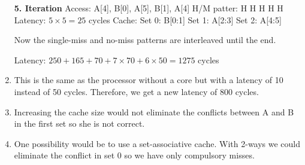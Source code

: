 \documentclass[a4paper]{article}
\begin{document}
\begin{enumerate}[label=\alph*)]
        \textbf{5. Iteration} \newline
        Access: A[4], B[0], A[5], B[1], A[4] \newline
        H/M patter: H H H H H \newline
        Latency: $5 \times 5 = 25$ cycles \newline
        Cache: Set 0: B[0:1] Set 1: A[2:3] Set 2: A[4:5] \newline

        Now the single-miss and no-miss patterns are interleaved until the end.

        Latency: $250 + 165 + 70 + 7 \times 70 + 6 \times 50 = 1275$ cycles
    

    \item This is the same as the processor without a core but with a latency of 10 instead of 50 cycles.
        Therefore, we get a new latency of 800 cycles.
    
    \item Increasing the cache size would not eliminate the conflicts between A and B in the first set
        so she is not correct.

    \item One possibility would be to use a set-associative cache. With 2-ways we could eliminate the
        conflict in set 0 so we have only compulsory misses.
\end{enumerate}
\end{document}
